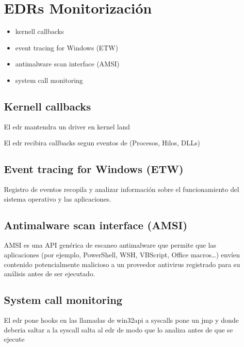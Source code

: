\chapter{EDRs Monitorización}

\begin{itemize}
    \item kernell callbacks
    \item event tracing for Windows (ETW)
    \item antimalware scan interface (AMSI)
    \item system call monitoring
\end{itemize}

\section{Kernell callbacks}

El edr mantendra un driver en kernel land

El edr recibira callbacks segun eventos de (Procesos, Hilos, DLLs)

\section{Event tracing for Windows (ETW)}

Registro de eventos recopila y analizar información sobre el funcionamiento 
del sistema operativo y las aplicaciones.

\section{Antimalware scan interface (AMSI)}

AMSI es una API genérica de escaneo antimalware que permite que las aplicaciones
(por ejemplo, PowerShell, WSH, VBScript, Office macros…) envíen contenido 
potencialmente malicioso a un proveedor antivirus registrado para su análisis 
antes de ser ejecutado.

\section{System call monitoring}

El edr pone hooks en las llamadas de win32api a syscalls
pone un jmp y donde deberia saltar a la syscall salta al edr de modo que lo 
analiza antes de que se ejecute
